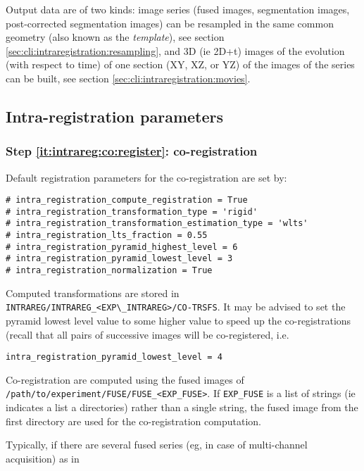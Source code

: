 Output data are of two kinds: image series (fused images, segmentation
images, post-corrected segmentation images) can be resampled in the
same common geometry (also known as the \textit{template}), see
section \ref{sec:cli:intraregistration:resampling}, and 3D (ie 2D+t)
images of the evolution (with respect to time) of one section (XY, XZ,
or YZ) of the images of the series can be built, see
section \ref{sec:cli:intraregistration:movies}.




\subsection{Intra-registration parameters}

\subsubsection{Step \ref{it:intrareg:co:register}: co-registration}
\label{sec:cli:intraregistration:coregistration}
Default registration parameters for the co-registration are set by:
\begin{verbatim}
# intra_registration_compute_registration = True
# intra_registration_transformation_type = 'rigid'
# intra_registration_transformation_estimation_type = 'wlts'
# intra_registration_lts_fraction = 0.55
# intra_registration_pyramid_highest_level = 6
# intra_registration_pyramid_lowest_level = 3
# intra_registration_normalization = True
\end{verbatim}
Computed transformations are stored in \verb|INTRAREG/INTRAREG_<EXP\_INTRAREG>/CO-TRSFS|.
It may be advised to set the pyramid lowest level value to some higher value to speed up the co-registrations (recall that all pairs of successive images will be co-registered, i.e.
\begin{verbatim}
intra_registration_pyramid_lowest_level = 4
\end{verbatim}

Co-registration are computed using the fused images of
\texttt{/path/to/experiment/FUSE/FUSE\_<EXP\_FUSE>}. If
\texttt{EXP\_FUSE} is a list of strings (ie indicates a list a
directories) rather than a single string, the fused image from the
first directory are used for the co-registration computation.

Typically, if there are several fused series (eg, in case of multi-channel
acquisition) as in

\mbox{}
\mbox{}

